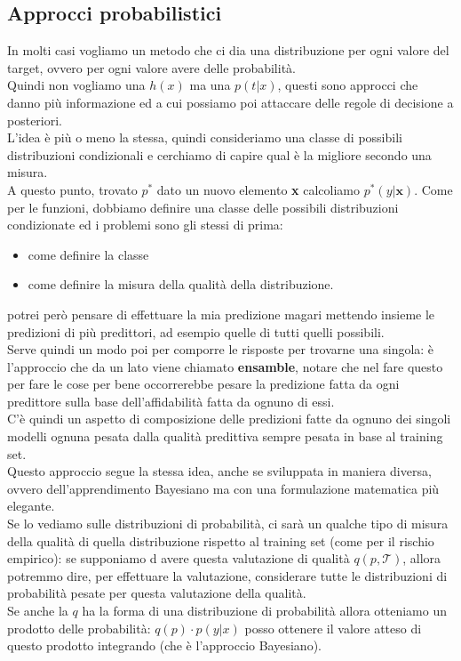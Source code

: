 \documentclass[12pt, oneside]{extbook}
\begin{document}
\subsection{Approcci probabilistici}
In molti casi vogliamo un metodo che ci dia una distribuzione per ogni valore del target, ovvero per ogni valore avere delle probabilità.\\Quindi non vogliamo una $h(x)$ ma una $p(t|x)$, questi sono approcci che danno più informazione ed a cui possiamo poi attaccare delle regole di decisione a posteriori.\\L'idea è più o meno la stessa, quindi consideriamo una classe di possibili distribuzioni condizionali e cerchiamo di capire qual è la migliore secondo una misura.\\A questo punto, trovato $p^*$ dato un nuovo elemento \textbf{x} calcoliamo $p^*(y | \boldsymbol{x})$. Come per le funzioni, dobbiamo definire una classe delle possibili distribuzioni condizionate ed i problemi sono gli stessi di prima:
\begin{itemize}
	\item come definire la classe
	\item come definire la misura della qualità della distribuzione.
\end{itemize}
potrei però pensare di effettuare la mia predizione magari mettendo insieme le predizioni di più predittori, ad esempio quelle di tutti quelli possibili.\\Serve quindi un modo poi per comporre le risposte per trovarne una singola: è l'approccio che da un lato viene chiamato \textbf{ensamble}, notare che nel fare questo per fare le cose per bene occorrerebbe pesare la predizione fatta da ogni predittore sulla base dell'affidabilità fatta da ognuno di essi.\\C'è quindi un aspetto di composizione delle predizioni fatte da ognuno dei singoli modelli ognuna pesata dalla qualità predittiva sempre pesata in base al training set.\\Questo approccio segue la stessa idea, anche se sviluppata in maniera diversa, ovvero dell'apprendimento Bayesiano ma con una formulazione matematica più elegante.\\Se lo vediamo sulle distribuzioni di probabilità, ci sarà un qualche tipo di misura della qualità di quella distribuzione rispetto al training set (come per il rischio empirico): se supponiamo d avere questa valutazione di qualità $q(p, \mathscr{T})$, allora potremmo dire, per effettuare la valutazione, considerare tutte le distribuzioni di probabilità pesate per questa valutazione della qualità.\\Se anche la $q$ ha la forma di una distribuzione di probabilità allora otteniamo un prodotto delle probabilità: $q(p) \cdot p(y|x)$ posso ottenere il valore atteso di questo prodotto integrando (che è l'approccio Bayesiano).












	
	
	
	
	
	
	
	
	
	
	
	
	
	
	
	
	
	
	
	
	
\end{document}
